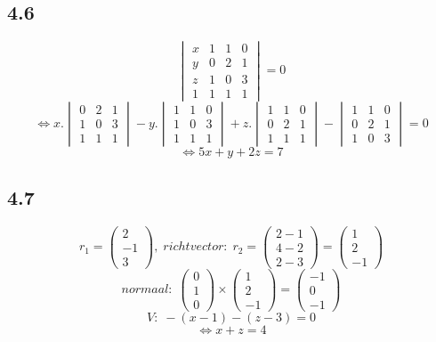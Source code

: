 \documentclass[11pt]{article}
\begin{document}
\subsection*{4.6}
\[
\begin{vmatrix}
x & 1 & 1 & 0\\
y & 0 & 2 & 1\\
z & 1 & 0 & 3\\
1 & 1 & 1 & 1
\end{vmatrix}
=0
\]
\[
\Leftrightarrow
x.\begin{vmatrix}
0 & 2 & 1\\
1 & 0 & 3\\
1 & 1 & 1
\end{vmatrix}
-y.\begin{vmatrix}
1 & 1 & 0\\
1 & 0 & 3\\
1 & 1 & 1
\end{vmatrix}
+z.\begin{vmatrix}
1 & 1 & 0\\
0 & 2 & 1\\
1 & 1 & 1
\end{vmatrix}
-\begin{vmatrix}
1 & 1 & 0\\
0 & 2 & 1\\
1 & 0 & 3
\end{vmatrix}
=0
\]
\[
\Leftrightarrow 5x+y+2z=7
\]

\subsection*{4.7}
\[
r_1=
\begin{pmatrix}
2\\-1\\3
\end{pmatrix}
,\;richtvector:\; r_2=
\begin{pmatrix}
2-1\\4-2\\2-3
\end{pmatrix}
=\begin{pmatrix}
1\\2\\-1
\end{pmatrix}
\]
\[
normaal:\;\begin{pmatrix}
0\\1\\0
\end{pmatrix}
\times
\begin{pmatrix}
1\\2\\-1
\end{pmatrix}
=
\begin{pmatrix}
-1\\0\\-1
\end{pmatrix}
\]
\[
V:\;-(x-1)-(z-3)=0
\]
\[
\Leftrightarrow x+z=4
\]
\end{document}
